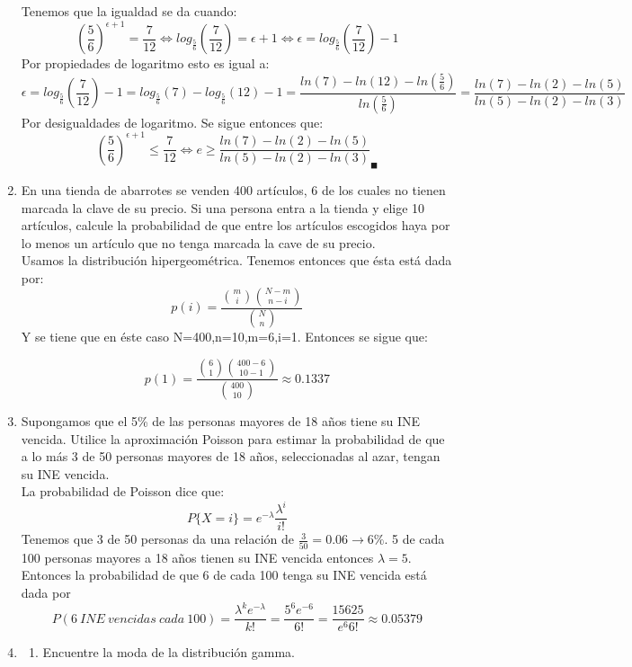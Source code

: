 \documentclass[11pt,a4paper]{report}
\begin{document}
\begin{enumerate}
{            Tenemos que la igualdad se da cuando:
            $$(\frac{5}{6})^{\epsilon+1}=\frac{7}{12}\Leftrightarrow log_{\frac{5}{6}}(\frac{7}{12})=\epsilon+1 \Leftrightarrow \epsilon=log_{\frac{5}{6}}(\frac{7}{12})-1
            $$
            Por propiedades de logaritmo esto es igual a:
            $$\epsilon=log_{\frac{5}{6}}(\frac{7}{12})-1=log_{\frac{5}{6}}(7)-log_{\frac{5}{6}}(12)-1=\frac{ln(7)-ln(12)-ln(\frac{5}{6})}{ln(\frac{5}{6})}=\frac{ln(7)-ln(2)-ln(5)}{ln(5)-ln(2)-ln(3)}$$
            Por desigualdades de logaritmo. Se sigue entonces que:
            $$(\frac{5}{6})^{\epsilon+1}\leq \frac{7}{12}\Leftrightarrow e\geq \frac{ln(7)-ln(2)-ln(5)}{ln(5)-ln(2)-ln(3)}_{\blacksquare}$$
		}

		\item{
			En una tienda de abarrotes se venden 400 artículos, 6 de los cuales
            no tienen marcada la clave de su precio. Si una persona entra a la
            tienda y elige 10 artículos, calcule la probabilidad de que entre
            los  artículos escogidos haya por lo menos un artículo que no tenga
            marcada la cave de su precio.
            \\
            Usamos la distribución hipergeométrica. Tenemos entonces que ésta está dada por:
            $$p(i)=\frac{\binom{m}{i}\binom{N-m}{n-i}}{\binom{N}{n}}$$
            Y se tiene que en éste caso N=400,n=10,m=6,i=1. Entonces se sigue que:
            
            $$p(1)=\frac{\binom{6}{1}\binom{400-6}{10-1}}{\binom{400}{10}}\approx 0.1337 $$
		}

		\item{
			Supongamos que el 5\% de las personas mayores de 18 años tiene su
            INE vencida. Utilice la aproximación Poisson para estimar la
            probabilidad de que a lo más 3 de 50 personas mayores de 18 años,
            seleccionadas al azar, tengan su INE vencida.\\
            La probabilidad de Poisson dice que:
            $$P\lbrace X=i \rbrace = e^{-\lambda} \frac{\lambda^{i}}{i!}$$
            Tenemos que 3 de 50 personas da una relación de $\frac{3}{50}=0.06 \rightarrow 6\%$. 5 de cada 100 personas mayores a 18 años tienen su INE vencida entonces $\lambda=5$. Entonces la probabilidad de que 6 de cada 100 tenga su INE vencida está dada por
            $$P(6 \ INE \ vencidas \ cada \ 100)=\frac{\lambda^{k}e^{-\lambda}}{k!}=\frac{5^{6}e^{-6}}{6!}=\frac{15625}{e^{6} 6!}\approx 0.05379$$
		}

		\item{
			\begin{enumerate}
				\item {
					Encuentre la moda de la distribución gamma.
					
}
\end{enumerate}}
\end{enumerate}
\end{document}
